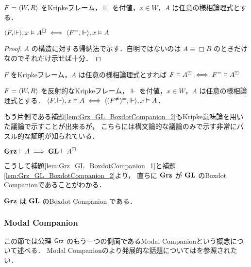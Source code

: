 \documentclass{jlreq}
\begin{document}
\begin{lemma}
	$F = \langle W, R \rangle$ をKripkeフレーム，$\Vdash$ を付値，$x \in W$，$A$ は任意の様相論理式とする．

	$\langle F, \Vdash \rangle, x \vDash A^\boxdot \iff \langle F^{=}, \Vdash \rangle, x \vDash A$
\end{lemma}

\begin{proof}
	$A$ の構造に対する帰納法で示す．自明ではないのは $A \equiv \Box B$ のときだけなのでそれだけ示せば十分．
\end{proof}

\begin{corollary}
	$F$ をKripkeフレーム，$A$ は任意の様相論理式とすれば $F \vDash A^\boxdot \iff F^{=} \vDash A^\boxdot$
\end{corollary}

\begin{lemma}
	$F = \langle W, R \rangle$ を反射的なKripkeフレーム，$\Vdash$ を付値，$x \in W$，$A$ は任意の様相論理式とする．
	$\langle F,\Vdash \rangle, x \vDash A \iff \langle (F^{\neq})^{=}, \Vdash \rangle, x \vDash A$．
\end{lemma}


もう片側である補題\ref{lem:Grz_GL_BoxdotCompanion_2}もKripke意味論を用いた議論で示すことが出来るが，
こちらには構文論的な議論のみで示す非常にパズル的な証明\cite[pp163-164]{boolos_logic_1994}が知られている．

\begin{lemma}\label{lem:Grz_GL_BoxdotCompanion_2}
	$\mathbf{Grz} \vdash A \implies \mathbf{GL} \vdash A^\boxdot$
\end{lemma}


こうして補題\ref{lem:Grz_GL_BoxdotCompanion_1}と補題\ref{lem:Grz_GL_BoxdotCompanion_2}より，
直ちに $\mathbf{Grz}$ が $\mathbf{GL}$ のBoxdot Companionであることがわかる．

\begin{theorem}\label{thm:Grz_GL_BoxdotCompanion}
	$\mathbf{Grz}$ は $\mathbf{GL}$ のBoxdot Companion である．
\end{theorem}


\subsubsection{Modal Companion}\label{sect:modal_copanion}

この節では公理 $\mathsf{Grz}$ のもう一つの側面であるModal Companionという概念について述べる．
Modal Companionのより発展的な話題については\cite*{chagrov_modal_1992}を参照されたい．
\end{document}
